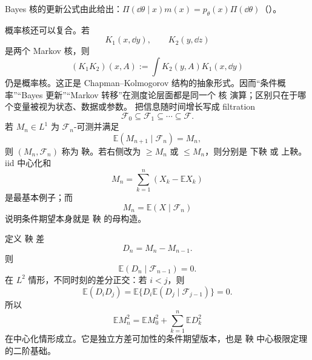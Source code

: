 Bayes 核的更新公式由此给出：$\Pi(\dd\theta\mid x)m(x)=p_\theta(x)\Pi(\dd\theta)$（）。

概率核还可以复合。若
\[
K_1(x,\dd y),\qquad K_2(y,\dd z)
\]
是两个 Markov 核，则
\begin{equation*}(K_1K_2)(x,A)
:=\int K_2(y,A)K_1(x,\dd y)\end{equation*}
仍是概率核。这正是 Chapman--Kolmogorov 结构的抽象形式。因而“条件概率”“Bayes 更新”“Markov 转移”在测度论层面都是同一个 核 演算；区别只在于哪个变量被视为状态、数据或参数。
把信息随时间增长写成 filtration
\[
\mathcal F_0\subseteq\mathcal F_1\subseteq\cdots\subseteq\mathcal F.
\]
若 $M_n\in L^1$ 为 $\mathcal F_n$-可测并满足
\begin{equation*}\mathbb E(M_{n+1}\mid\mathcal F_n)=M_n,\end{equation*}
则 $(M_n,\mathcal F_n)$ 称为 鞅。若右侧改为 $\ge M_n$ 或 $\le M_n$，则分别是 下鞅 或 上鞅。iid 中心化和
\[
M_n=\sum_{k=1}^n(X_k-\mathbb E X_k)
\]
是最基本例子；而
\[
M_n=\mathbb E(X\mid\mathcal F_n)
\]
说明条件期望本身就是 鞅 的母构造。

定义 鞅 差
\[
D_n=M_n-M_{n-1}.
\]
则
\[
\mathbb E(D_n\mid\mathcal F_{n-1})=0.
\]
在 $L^2$ 情形，不同时刻的差分正交：若 $i<j$，则
\[
\mathbb E(D_iD_j)
=\mathbb E\{D_i\mathbb E(D_j\mid\mathcal F_{j-1})\}=0.
\]
所以
\begin{equation*}\mathbb E M_n^2
=\mathbb E M_0^2+
\sum_{k=1}^n\mathbb E D_k^2\end{equation*}
在中心化情形成立。它是独立方差可加性的条件期望版本，也是 鞅 中心极限定理 的二阶基础。

